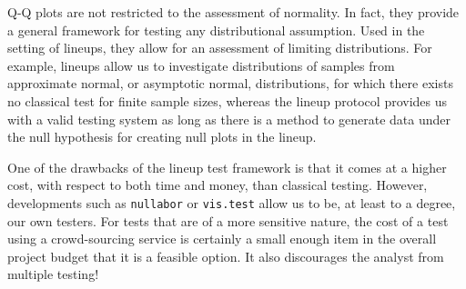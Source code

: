 \documentclass[12pt]{article}\usepackage[]{graphicx}\usepackage[]{color}
\begin{document}

Q-Q plots are not restricted to the assessment of normality. In fact, they provide a general framework for testing any distributional assumption. Used in the setting of lineups, they allow for an assessment of limiting distributions. For example, lineups allow us to investigate distributions of
 samples from approximate normal, or asymptotic normal, distributions, for which  there exists  no classical test for finite sample sizes, whereas the lineup protocol provides us with a valid testing system
  as long as there is a method  to generate data under the null hypothesis for creating null plots in the lineup.
 

One of the drawbacks of the lineup test framework is that it comes at a higher cost, with respect to both time and money, than classical testing.
However, developments such as {\tt nullabor} \citep{nullabor} or {\tt vis.test} \citep{vistest} allow us to be, at least to a degree, our own testers. For tests that are of a more sensitive nature, the cost of a test using a crowd-sourcing service is certainly a small enough item in the overall project budget that it is a feasible 
option. It also discourages the analyst from multiple testing!
\end{document}
